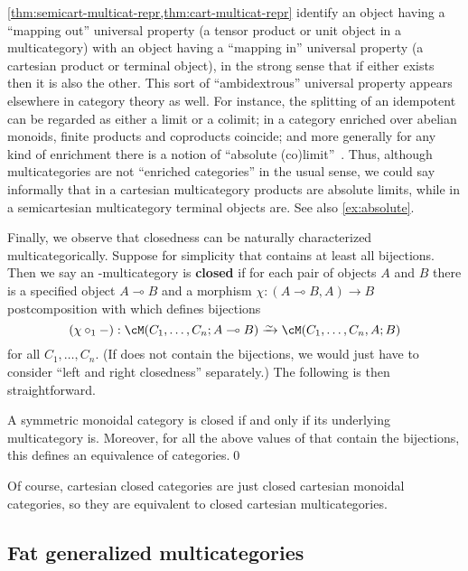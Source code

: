 \documentclass{book}
\let\hom\multimap
\begin{document}
\begin{rmk}\label{rmk:absolute}
  \cref{thm:semicart-multicat-repr,thm:cart-multicat-repr} identify an object having a ``mapping out'' universal property (a tensor product or unit object in a multicategory) with an object having a ``mapping in'' universal property (a cartesian product or terminal object), in the strong sense that if either exists then it is also the other.
  This sort of ``ambidextrous'' universal property appears elsewhere in category theory as well.
  For instance, the splitting of an idempotent can be regarded as either a limit or a colimit; in a category enriched over abelian monoids, finite products and coproducts coincide; and more generally for any kind of enrichment there is a notion of ``absolute (co)limit''~\cite{street:absolute}.
  Thus, although multicategories are not ``enriched categories'' in the usual sense, we could say informally that in a cartesian multicategory products are absolute limits, while in a semicartesian multicategory terminal objects are.
  See also \cref{ex:absolute}.
\end{rmk}

Finally, we observe that closedness can be naturally characterized multicategorically.
Suppose for simplicity that \fS contains at least all bijections.
Then we say an \fS-multicategory is \textbf{closed} if for each pair of objects $A$ and $B$ there is a specified object $A\hom B$ and a morphism $\chi : (A\hom B,A) \to B$ postcomposition with which defines bijections
\[ (\chi\circ_1 -): \cM(C_1,\dots,C_n;A\hom B) \toiso \cM(C_1,\dots,C_n,A;B) \]
for all $C_1,\dots,C_n$.
(If \fS does not contain the bijections, we would just have to consider ``left and right closedness'' separately.)
The following is then straightforward.

\begin{thm}\label{thm:moncat-repr-closed}
  A symmetric monoidal category is closed if and only if its underlying multicategory is.
  Moreover, for all the above values of \fS that contain the bijections, this defines an equivalence of categories.\qed
\end{thm}

Of course, cartesian closed categories are just closed cartesian monoidal categories, so they are equivalent to closed cartesian multicategories.

\subsection{Fat generalized multicategories}
\label{sec:fat-cartmulti}
\end{document}
